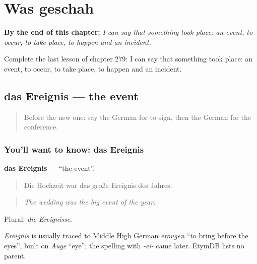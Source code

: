 
\chapter{Was geschah}
\label{ch:ge-was-geschah}

\begin{chapteropening}
\textbf{By the end of this chapter:} \emph{I can say that something took place: an event, to occur, to take place, to happen and an incident.}

Complete the last lesson of chapter 279: I can say that something took place: an event, to occur, to take place, to happen and an incident.
\end{chapteropening}

\section[das Ereignis]{das Ereignis — the event}

\label{lesson:GE-C279-ereignis}



\begin{quote}
Before the new one: say the German for to sign, then the German for the conference.
\end{quote}

\subsection*{You'll want to know: das Ereignis}
\textbf{das Ereignis} — \textquotedblleft{}the event\textquotedblright{}.

\begin{quote}
Die Hochzeit war das große Ereignis des Jahres.
\end{quote}

\begin{quote}
\emph{The wedding was the big event of the year.}
\end{quote}

Plural: \emph{die Ereignisse}.

\begin{cousinweb}
\emph{Ereignis} is usually traced to Middle High German \emph{eröugen} \textquotedblleft{}to bring before the eyes\textquotedblright{}, built on \emph{Auge} \textquotedblleft{}eye\textquotedblright{}; the spelling with \emph{-ei-} came later. EtymDB lists no parent.
\end{cousinweb}

